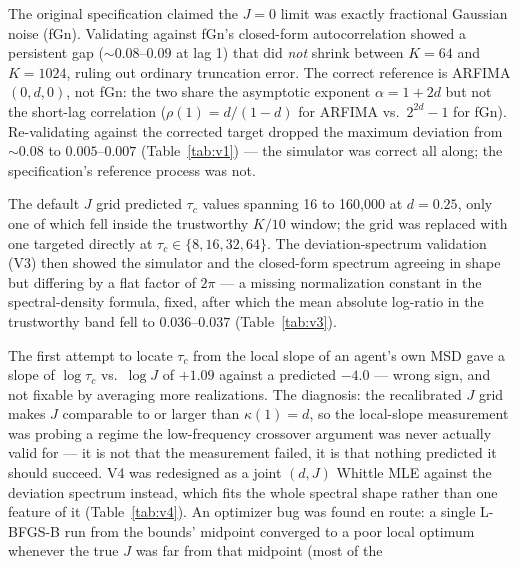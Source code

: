 \documentclass[11pt]{article}
\begin{document}
\begin{description}[leftmargin=1.4em, style=nextline]
\item[V1: wrong reference process.] The original specification claimed the
  $J{=}0$ limit was exactly fractional Gaussian noise (fGn). Validating
  against fGn's closed-form autocorrelation showed a persistent gap
  ($\sim0.08$--$0.09$ at lag 1) that did \emph{not} shrink between $K{=}64$
  and $K{=}1024$, ruling out ordinary truncation error. The correct reference
  is ARFIMA$(0,d,0)$, not fGn: the two share the asymptotic exponent
  $\alpha{=}1{+}2d$ but not the short-lag correlation
  ($\rho(1)=d/(1-d)$ for ARFIMA vs.\ $2^{2d}-1$ for fGn). Re-validating
  against the corrected target dropped the maximum deviation from $\sim0.08$
  to $0.005$--$0.007$ (Table~\ref{tab:v1}) --- the simulator was correct all
  along; the specification's reference process was not.
\item[V2/V3: sweep recalibration and a normalization bug.] The default $J$
  grid predicted $\tau_c$ values spanning 16 to 160{,}000 at $d{=}0.25$, only
  one of which fell inside the trustworthy $K/10$ window; the grid was
  replaced with one targeted directly at $\tau_c\in\{8,16,32,64\}$. The
  deviation-spectrum validation (V3) then showed the simulator and the
  closed-form spectrum agreeing in shape but differing by a flat factor of
  $2\pi$ --- a missing normalization constant in the spectral-density
  formula, fixed, after which the mean absolute log-ratio in the trustworthy
  band fell to $0.036$--$0.037$ (Table~\ref{tab:v3}).
\item[V4: redesigned from a crossover measurement to a joint fit.] The first
  attempt to locate $\tau_c$ from the local slope of an agent's own MSD gave
  a slope of $\log\tau_c$ vs.\ $\log J$ of $+1.09$ against a predicted
  $-4.0$ --- wrong sign, and not fixable by averaging more realizations. The
  diagnosis: the recalibrated $J$ grid makes $J$ comparable to or larger
  than $\kappa(1)=d$, so the local-slope measurement was probing a regime the
  low-frequency crossover argument was never actually valid for --- it is not
  that the measurement failed, it is that nothing predicted it should
  succeed. V4 was redesigned as a joint $(d,J)$ Whittle MLE against the
  deviation spectrum instead, which fits the whole spectral shape rather than
  one feature of it (Table~\ref{tab:v4}). An optimizer bug was found en
  route: a single L-BFGS-B run from the bounds' midpoint converged to a poor
  local optimum whenever the true $J$ was far from that midpoint (most of the

\end{description}
\end{document}
